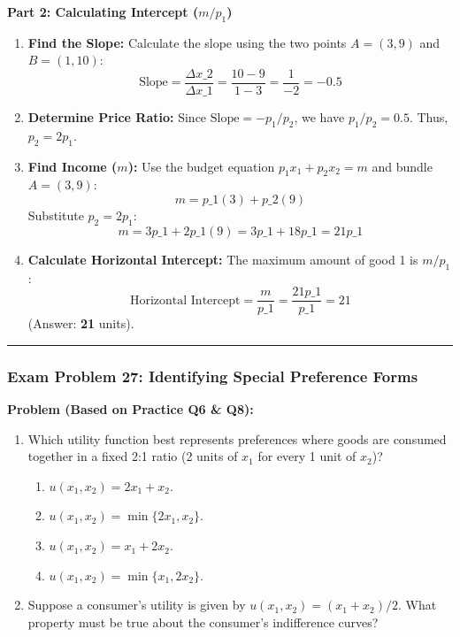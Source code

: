 \documentclass{article}
\begin{document}
\textbf{Part 2: Calculating Intercept ($m/p_1$)}
\begin{enumerate}
    \item \textbf{Find the Slope:} Calculate the slope using the two points $A=(3, 9)$ and $B=(1, 10)$:
    \[\text{Slope} = \frac{\Delta x\_2}{\Delta x\_1} = \frac{10 - 9}{1 - 3} = \frac{1}{-2} = -0.5\]
    \item \textbf{Determine Price Ratio:} Since $\text{Slope} = -p_1/p_2$, we have $p_1/p_2 = 0.5$. Thus, $p_2 = 2p_1$.
    \item \textbf{Find Income ($m$):} Use the budget equation $p_1 x_1 + p_2 x_2 = m$ and bundle $A=(3, 9)$:
    \[ m = p\_1(3) + p\_2(9) \]
    Substitute $p_2 = 2p_1$:
    \[ m = 3p\_1 + 2p\_1(9) = 3p\_1 + 18p\_1 = 21p\_1 \]
    \item \textbf{Calculate Horizontal Intercept:} The maximum amount of good 1 is $m/p_1$:
    \[\text{Horizontal Intercept} = \frac{m}{p\_1} = \frac{21 p\_1}{p\_1} = 21\]
    (Answer: \textbf{21} units).
\end{enumerate}

\bigskip\hrule\bigskip

\subsubsection*{Exam Problem 27: Identifying Special Preference Forms}

\textbf{Problem (Based on Practice Q6 \& Q8):}
\begin{enumerate}
    \item Which utility function best represents preferences where goods are consumed together in a fixed 2:1 ratio (2 units of $x_1$ for every 1 unit of $x_2$)?
    \begin{enumerate}
        \renewcommand{\theenumii}{\alph{enumii}}
        \renewcommand{\labelenumii}{(\theenumii)}
        \item $u(x_1, x_2) = 2x_1 + x_2$.
        \item $u(x_1, x_2) = \min\{2x_1, x_2\}$.
        \item $u(x_1, x_2) = x_1 + 2x_2$.
        \item $u(x_1, x_2) = \min\{x_1, 2x_2\}$.
    \end{enumerate}
    \item Suppose a consumer's utility is given by $u(x_1, x_2) = (x_1 + x_2)/2$. What property must be true about the consumer's indifference curves?
\end{enumerate}
\end{document}
